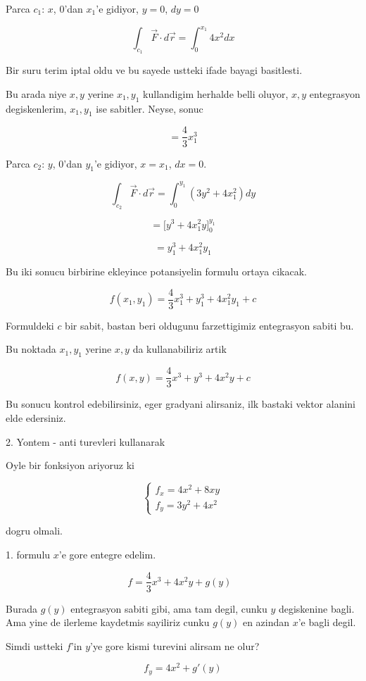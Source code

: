 \documentclass[12pt,fleqn]{article}
\begin{document}
Parca $c_1$: $x$, 0'dan $x_1$'e gidiyor, $y=0$, $dy = 0$

\[ \int_{c_1} \vec{F} \cdot d\vec{r} = 
\int_0^{x_1} 4x^2 dx 
\]

Bir suru terim iptal oldu ve bu sayede ustteki ifade bayagi basitlesti. 

Bu arada niye $x,y$ yerine $x_1,y_1$ kullandigim herhalde belli oluyor,
$x,y$ entegrasyon degiskenlerim, $x_1,y_1$ ise sabitler. Neyse, sonuc

\[ = \frac{4}{3} x_1^3\]

Parca $c_2$: $y$, 0'dan $y_1$'e gidiyor, $x=x_1$, $dx = 0$. 

\[ \int_{c_2} \vec{F} \cdot d\vec{r} = 
\int_0^{y_1} (3y^2 + 4x_1^2) dy
\]

\[ = \bigg[ y^3 + 4x_1^2y \bigg]_0^{y_1} \]


\[ = y_1^3 + 4x_1^2y_1 \]

Bu iki sonucu birbirine ekleyince potansiyelin formulu ortaya cikacak.

\[ f(x_1,y_1) = \frac{4}{3} x_1^3 + y_1^3 + 4x_1^2y_1 + c\]

Formuldeki $c$ bir sabit, bastan beri oldugunu farzettigimiz entegrasyon
sabiti bu. 

Bu noktada $x_1,y_1$ yerine $x,y$ da kullanabiliriz artik

\[ f(x,y) = \frac{4}{3} x^3 + y^3 + 4x^2y + c\]

Bu sonucu kontrol edebilirsiniz, eger gradyani alirsaniz, ilk bastaki
vektor alanini elde edersiniz. 

2. Yontem - anti turevleri kullanarak

Oyle bir fonksiyon ariyoruz ki 

\[ 
\left\{ \begin{array}{l}
f_x = 4x^2 + 8xy \\
f_y = 3y^2 + 4x^2
\end{array} \right.
 \]

dogru olmali. 

1. formulu $x$'e gore entegre edelim. 

\[ f = \frac{4}{3}x^3 + 4x^2y + g(y) \ \ \ \label{1}\]

Burada $g(y)$ entegrasyon sabiti gibi, ama tam degil, cunku $y$ degiskenine
bagli. Ama yine de ilerleme kaydetmis sayiliriz cunku $g(y)$ en azindan
$x$'e bagli degil. 

Simdi ustteki $f$'in $y$'ye gore kismi turevini alirsam ne olur? 

\[ f_y = 4x^2 + g'(y) \]
\end{document}
